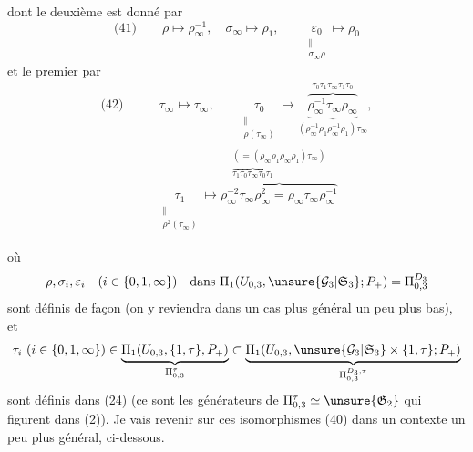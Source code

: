 dont le deuxième est donné par
\[
\text{(41)}\qquad
\boxed{\rho\longmapsto\rho_\infty^{-1},\quad\sigma_\infty\longmapsto\rho_1},
\qquad
\underset{\substack{\Vert\\\sigma_\infty\rho}}{\varepsilon_0}\longmapsto\rho_0
\]
et le \uline{premier par}
\[
\begin{aligned}
\text{(42)}\qquad
&\boxed{\tau_\infty\longmapsto\tau_\infty},\qquad
\underset{\substack{\Vert\\\rho(\tau_\infty)}}{\tau_0}
\longmapsto
\underbrace{\overbrace{\rho_\infty^{-1}\tau_\infty\rho_\infty}^{\tau_0\tau_1\tau_\infty\tau_1\tau_0}}_{(\rho_\infty^{-1}\rho_1\rho_\infty^{-1}\rho_1)\tau_\infty},\\
&
\underset{\substack{\Vert\\\rho^2(\tau_\infty)}}{\tau_1}
\longmapsto
\overbrace{\rho_\infty^{-2}\tau_\infty\rho_\infty^2
=\rho_\infty\tau_\infty\rho_\infty^{-1}}^{\substack{(=(\rho_\infty\rho_1\rho_\infty\rho_1)\tau_\infty)\\
\overbrace{\tau_1\tau_0\tau_\infty\tau_0\tau_1}}}
\end{aligned}
\]

où
\[
\rho,\sigma_i,\varepsilon_i\quad(i\in\{0,1,\infty\})
\quad\text{dans }\Pi_1(U_{0,3},\unsure{\mathcal G_3|\mathfrak S_3};P_+)=\Pi_{0,3}^{D_3}
\]
sont définis de façon  (on y reviendra dans un cas plus général un peu plus bas), et
\[
\tau_i\ (i\in\{0,1,\infty\})\in
\underbrace{\Pi_1(U_{0,3},\{1,\tau\},P_+)}_{\Pi_{0,3}^{\tau}}
\subset
\underbrace{\Pi_1(U_{0,3},\unsure{\mathcal G_3|\mathfrak S_3}\times\{1,\tau\};P_+)}_{\Pi_{0,3}^{D_3,\tau}}
\]
sont définis dans (24) (ce sont les générateurs de $\Pi_{0,3}^{\tau}\simeq\unsure{\mathfrak G_2}$ qui figurent dans (2)). Je vais revenir sur ces isomorphismes (40) dans un contexte un peu plus général, ci-dessous.

